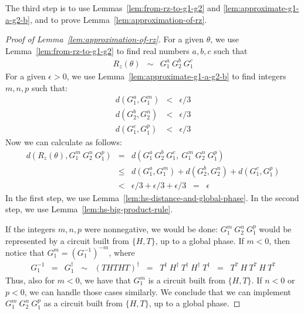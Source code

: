 \documentclass[11pt]{article}
\def\({\begin{eqnarray*}}
\def\){\end{eqnarray*}}
\newtheorem{lemma}[theorem]{Lemma}
\begin{document}
% 

The third step is to use
Lemmas~\ref{lem:from-rz-to-g1-g2} and \ref{lem:approximate-g1-a-g2-b}, and
to prove Lemma~\ref{lem:approximation-of-rz}.

\begin{proof}[Proof of Lemma~\ref{lem:approximation-of-rz}]
For a given $\theta$, 
we use Lemma~\ref{lem:from-rz-to-g1-g2} to find real numbers $a,b,c$ such that
\(
R_z(\theta) &\sim& G_1^a\ G_2^b\ G_1^c
\)
For a given $\epsilon > 0$, we use 
Lemma~\ref{lem:approximate-g1-a-g2-b} 
to find integers $m,n,p$ such that:
\(
d(G_1^a, G_1^m) &<& \epsilon/3 \\
d(G_2^b, G_2^n) &<& \epsilon/3 \\
d(G_1^c, G_1^p) &<& \epsilon/3
\)
Now we can calculate as follows:
\(
d(R_z(\theta), G_1^m\ G_2^n\ G_1^p) 
&=& 
d(G_1^a\ G_2^b\ G_1^c,\ G_1^m\ G_2^n\ G_1^p) 
\\
&\leq&
d(G_1^a, G_1^m) + d(G_2^b, G_2^n) + d(G_1^c, G_1^p)
\\
&<&
\epsilon/3 + \epsilon/3 + \epsilon/3
\;\;=\;\; 
\epsilon
\)
In the first step, we use Lemma~\ref{lem:hs-distance-and-global-phase}.
In the second step, we use Lemma~\ref{lem:hs-big-product-rule}.

If the integers $m,n,p$ were nonnegative, we would be done:
$G_1^m\ G_2^n\ G_1^p$ would be represented by a circuit built from $\{H,T\}$,
up to a global phase.
If $m < 0$, then notice that 
$G_1^m = (G_1^{-1})^{-m}$, where 
\(
G_1^{-1} &=& G_1^\dag 
\;\;\sim\;\; 
(THTHT)^\dag 
\;\;=\;\;
T^\dag\ H^\dag\ T^\dag\ H^\dag\ T^\dag
\;\;=\;\;
T^7\ H\ T^7\ H\ T^7
\)
Thus, also for $m < 0$, we have that $G_1^m$ is a circuit built from $\{H,T\}$.
If $n < 0$ or $p < 0$, we can handle those cases similarly.
We conclude that we can implement $G_1^m\ G_2^n\ G_1^p$ as a circuit built 
from $\{H,T\}$, 
up to a global phase.
\end{proof}
\end{document}
